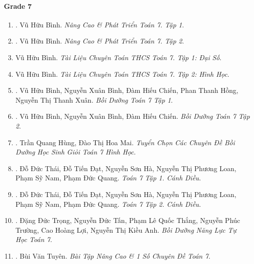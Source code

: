 \documentclass{article}
\begin{document}
\paragraph{Grade 7}

\begin{enumerate}
	\item \cite{Binh_Toan_7_tap_1}. Vũ Hữu Bình. {\it Nâng Cao \& Phát Triển Toán 7. Tập 1}.\hfill{\sf[done]}

	\item \cite{Binh_Toan_7_tap_2}. Vũ Hữu Bình. {\it Nâng Cao \& Phát Triển Toán 7. Tập 2}.\hfill{\sf[done]}

	\item Vũ Hữu Bình. {\it Tài Liệu Chuyên Toán THCS Toán 7. Tập 1: Đại Số}.

	\item Vũ Hữu Bình. {\it Tài Liệu Chuyên Toán THCS Toán 7. Tập 2: Hình Học}.

	\item \cite{Binh_boi_duong_Toan_7_tap_1}. Vũ Hữu Bình, Nguyễn Xuân Bình, Đàm Hiếu Chiến, Phan Thanh Hồng, Nguyễn Thị Thanh Xuân. {\it Bồi Dưỡng Toán 7 Tập 1}.\hfill{\sf[reading]}

	\item \cite{Binh_boi_duong_Toan_7_tap_2}. Vũ Hữu Bình, Nguyễn Xuân Bình, Đàm Hiếu Chiến. {\it Bồi Dưỡng Toán 7 Tập 2}.\hfill{\sf[reading]}

	\item \cite{Hung_Mai_Toan_7_hinh_hoc}. Trần Quang Hùng, Đào Thị Hoa Mai. {\it Tuyển Chọn Các Chuyên Đề Bồi Dưỡng Học Sinh Giỏi Toán 7 Hình Học}.

	\item \cite{SGK_Toan_7_CD_tap_1}. Đỗ Đức Thái, Đỗ Tiến Đạt, Nguyễn Sơn Hà, Nguyễn Thị Phương Loan, Phạm Sỹ Nam, Phạm Đức Quang. {\it Toán 7 Tập 1. Cánh Diều}.\hfill{\sf[done]}

	\item \cite{SGK_Toan_7_CD_tap_2}. Đỗ Đức Thái, Đỗ Tiến Đạt, Nguyễn Sơn Hà, Nguyễn Thị Phương Loan, Phạm Sỹ Nam, Phạm Đức Quang. {\it Toán 7 Tập 2. Cánh Diều}.\hfill{\sf[done]}

	\item \cite{Trong_Toan_7}. Đặng Đức Trọng, Nguyễn Đức Tấn, Phạm Lê Quốc Thắng, Nguyễn Phúc Trường, Cao Hoàng Lợi, Nguyễn Thị Kiều Anh. {\it Bồi Dưỡng Năng Lực Tự Học Toán 7}.\hfill{\sf[reading]}

	\item \cite{Tuyen_Toan_7}. Bùi Văn Tuyên. {\it Bài Tập Nâng Cao \& 1 Số Chuyên Đề Toán 7}.\hfill{\sf[done]}
\end{enumerate}
\end{document}

